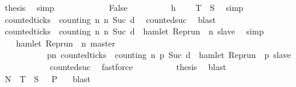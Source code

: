 \begin{isabellebody}
\ {\isacharquery}thesis\ \isamarkupfalse%
\ simp\isanewline
\ \ \ \ \isamarkupfalse%
\isanewline
\ \ \ \ \ \ \isamarkupfalse%
\ False\isanewline
\ \ \ \ \ \ \ \ \isamarkupfalse%
\ h\ \isamarkupfalse%
\ {}{\isacharcolon}{\isacartoucheopen}{\isasymrho}\ {\isasymin}\ {\isacharquery}T\ {\isasyminter}\ {\isacharquery}S{\isacartoucheclose}\ \isamarkupfalse%
\ simp\isanewline
\ \ \ \ \ \ \ \ \isamarkupfalse%
\ {\isacartoucheopen}{\isasymnot}counted{\isacharunderscore}ticks\ {\isasymrho}\ counting\ n\ n\ {\isacharparenleft}Suc\ d{\isacharparenright}{\isacartoucheclose}\ \isamarkupfalse%
\ counted{\isacharunderscore}suc\ \isamarkupfalse%
\ blast\isanewline
\ \ \ \ \ \ \ \ \isamarkupfalse%
\ {\isacartoucheopen}counted{\isacharunderscore}ticks\ {\isasymrho}\ counting\ n\ n\ {\isacharparenleft}Suc\ d{\isacharparenright}\ {\isasymlongrightarrow}\ hamlet\ {\isacharparenleft}Rep{\isacharunderscore}run\ {\isasymrho}\ n\ slave{\isacharparenright}{\isacartoucheclose}\ \isamarkupfalse%
\ simp\isanewline
\ \ \ \ \ \ \ \ \isamarkupfalse%
\ {}\ \isamarkupfalse%
\ {\isacartoucheopen}hamlet\ {\isacharparenleft}Rep{\isacharunderscore}run\ {\isasymrho}\ n\ master{\isacharparenright}\isanewline
\ \ \ \ \ \ \ \ \ \ {\isasymand}\ {\isacharparenleft}{\isasymforall}p{\isasymge}n{\isachardot}\ counted{\isacharunderscore}ticks\ {\isasymrho}\ counting\ n\ p\ {\isacharparenleft}Suc\ d{\isacharparenright}\ {\isasymlongrightarrow}\ hamlet\ {\isacharparenleft}Rep{\isacharunderscore}run\ {\isasymrho}\ p\ slave{\isacharparenright}{\isacharparenright}{\isacartoucheclose}\isanewline
\ \ \ \ \ \ \ \ \ \ \isamarkupfalse%
\ counted{\isacharunderscore}suc\ \isamarkupfalse%
\ fastforce\isanewline
\ \ \ \ \ \ \ \ \isamarkupfalse%
\ {\isacharquery}thesis\ \isamarkupfalse%
\ blast\isanewline
\ \ \ \ \isamarkupfalse%
\isanewline
\ \ \isacommand{{\isacharbraceright}}\isamarkupfalse%
\ \isamarkupfalse%
\ {\isacartoucheopen}{\isacharquery}N\ {\isasymunion}\ {\isacharquery}T\ {\isasyminter}\ {\isacharquery}S\ {\isasymsubseteq}\ {\isacharbraceleft}{\isasymrho}{\isachardot}\ {\isacharquery}P\ {\isasymrho}{\isacharbraceright}{\isacartoucheclose}\ \isamarkupfalse%
\ blast\isanewline
{}\isamarkupfalse%
%
\endisatagproof
{\isafoldproof}%
%
\isadelimproof

\end{isabellebody}
